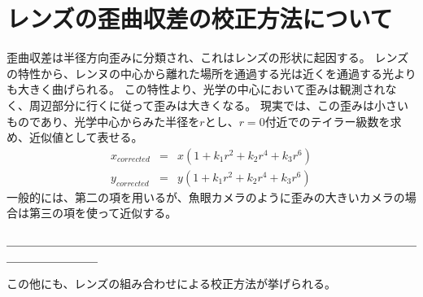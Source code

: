 \section{レンズの歪曲収差の校正方法について}
歪曲収差は半径方向歪みに分類され、これはレンズの形状に起因する。
レンズの特性から、レンヌの中心から離れた場所を通過する光は近くを通過する光よりも大きく曲げられる。
この特性より、光学の中心において歪みは観測されなく、周辺部分に行くに従って歪みは大きくなる。
現実では、この歪みは小さいものであり、光学中心からみた半径を\begin{math}{r}\end{math}とし、\begin{math}{r=0}\end{math}付近でのテイラー級数を求め、近似値として表せる。
\begin{eqnarray}
  x_{corrected} & = & x(1+k_1 r^2+k_2 r^4+k_3 r^6) \\
  y_{corrected} & = & y(1+k_1 r^2+k_2 r^4+k_3 r^6)
\end{eqnarray}
一般的には、第二の項を用いるが、魚眼カメラのように歪みの大きいカメラの場合は第三の項を使って近似する。

＿＿＿＿＿＿＿＿＿＿＿＿＿＿＿＿＿＿＿＿＿＿＿＿＿＿＿＿＿＿＿＿＿＿＿＿＿＿＿＿＿＿＿＿

この他にも、レンズの組み合わせによる校正方法が挙げられる。
